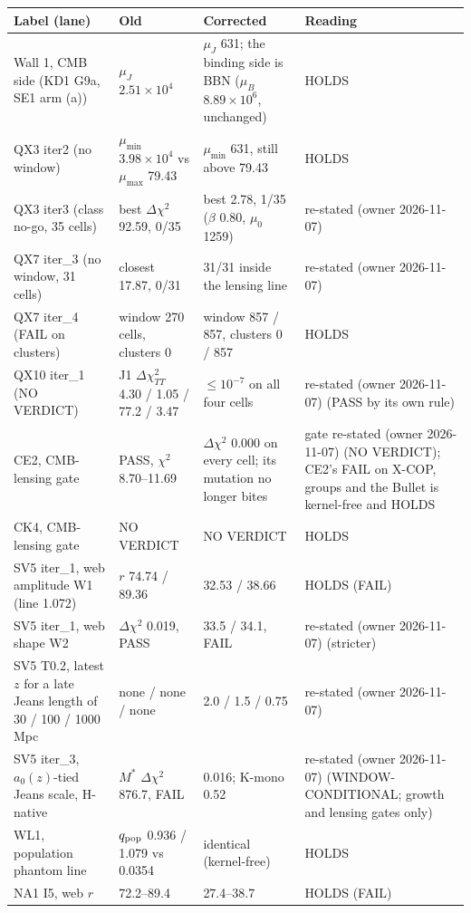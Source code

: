 \documentclass[10pt]{article}
\begin{document}
{\small
\begin{longtable}{@{}p{4.2cm}p{3.6cm}p{4.4cm}p{3.2cm}@{}}\toprule
Label (lane) & Old & Corrected & Reading\\\midrule\endhead
Wall 1, CMB side (KD1 G9a, SE1 arm (a)) & $\mu_J$ $2.51\times10^4$ & $\mu_J$ 631; the binding side is BBN ($\mu_B$ $8.89\times10^6$, unchanged) & HOLDS\\
QX3 iter2 (no window) & $\mu_{\min}$ $3.98\times10^4$ vs $\mu_{\max}$ 79.43 & $\mu_{\min}$ 631, still above 79.43 & HOLDS\\
QX3 iter3 (class no-go, 35 cells) & best $\Delta\chi^2$ 92.59, 0/35 & best 2.78, 1/35 ($\beta$ 0.80, $\mu_0$ 1259) & re-stated (owner 2026-11-07)\\
QX7 iter\_3 (no window, 31 cells) & closest 17.87, 0/31 & 31/31 inside the lensing line & re-stated (owner 2026-11-07)\\
QX7 iter\_4 (FAIL on clusters) & window 270 cells, clusters 0 & window 857 / 857, clusters 0 / 857 & HOLDS\\
QX10 iter\_1 (NO VERDICT) & J1 $\Delta\chi^2_{TT}$ 4.30 / 1.05 / 77.2 / 3.47 & $\le10^{-7}$ on all four cells & re-stated (owner 2026-11-07) (PASS by its own rule)\\
CE2, CMB-lensing gate & PASS, $\chi^2$ 8.70--11.69 & $\Delta\chi^2$ 0.000 on every cell; its mutation no longer bites & gate re-stated (owner 2026-11-07) (NO VERDICT); CE2's FAIL on X-COP, groups and the Bullet is kernel-free and HOLDS\\
CK4, CMB-lensing gate & NO VERDICT & NO VERDICT & HOLDS\\
SV5 iter\_1, web amplitude W1 (line 1.072) & $r$ 74.74 / 89.36 & 32.53 / 38.66 & HOLDS (FAIL)\\
SV5 iter\_1, web shape W2 & $\Delta\chi^2$ 0.019, PASS & 33.5 / 34.1, FAIL & re-stated (owner 2026-11-07) (stricter)\\
SV5 T0.2, latest $z$ for a late Jeans length of 30 / 100 / 1000\,Mpc & none / none / none & 2.0 / 1.5 / 0.75 & re-stated (owner 2026-11-07)\\
SV5 iter\_3, $a_0(z)$-tied Jeans scale, H-native & $M^*$ $\Delta\chi^2$ 876.7, FAIL & 0.016; K-mono 0.52 & re-stated (owner 2026-11-07) (WINDOW-CONDITIONAL; growth and lensing gates only)\\
WL1, population phantom line & $q_{\rm pop}$ 0.936 / 1.079 vs 0.0354 & identical (kernel-free) & HOLDS\\
NA1 I5, web $r$ & 72.2--89.4 & 27.4--38.7 & HOLDS (FAIL)\\

\end{longtable}}
\end{document}
